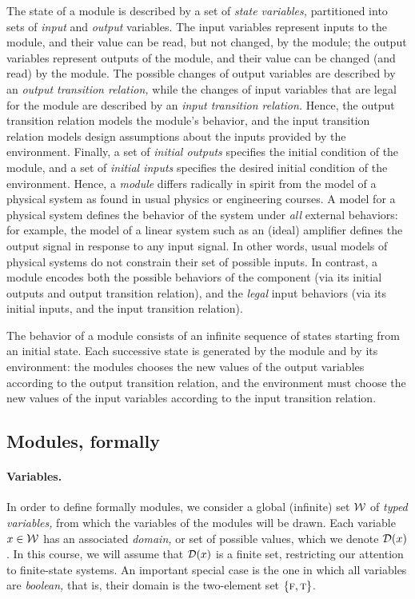 \documentclass[11pt]{report}
\begin{document}
The state of a module is described by a set of {\em state
variables,} partitioned into sets of {\em input\/} and {\em output\/}
variables.
The input variables represent inputs to the module, and their value
can be read, but not changed, by the module; the output variables
represent outputs of the module, and their value can be changed (and
read) by the module.
The possible changes of output variables are described by an
{\em output transition relation,} while the changes of input variables
that are legal for the module are described by an
{\em input transition relation.}
Hence, the output transition relation models the module's behavior,
and the input transition relation models design assumptions about the
inputs provided by the environment.
Finally, a set of {\em initial outputs\/} specifies the initial
condition of the module, and a set of {\em initial inputs\/} specifies
the desired initial condition of the environment.
Hence, a {\em module\/} differs radically in spirit from the model of
a physical system as found in usual physics or engineering courses.
A model for a physical system defines the behavior of the system under
{\em all\/} external behaviors: for example, the model of a linear
system such as an (ideal) amplifier defines the output signal in
response to any input signal.
In other words, usual models of physical systems do not constrain
their set of possible inputs.
In contrast, a module encodes both the possible behaviors of the
component (via its initial outputs and output transition relation),
and the {\em legal\/} input behaviors (via its initial inputs, and the
input transition relation).

The behavior of a module consists of an infinite sequence
of states starting from an initial state.
Each successive state is generated by the module and by its
environment:
the modules chooses the new values of the output
variables according to the output transition relation,
and the environment must choose the new values of the input variables
according to the input transition relation.


\subsection{Modules, formally}

\paragraph{Variables.}
In order to define formally modules, we consider a global
(infinite) set ${\cal W}$ of {\em typed variables,} from which the
variables of the modules will be drawn.
Each variable $x \in {\cal W}$ has an associated {\em domain,} or set
of possible values, which we denote ${\cal D}(x)$.
In this course, we will assume that ${\cal D}(x)$ is a finite set,
restricting our attention to finite-state systems.
An important special case is the one in which all variables are
{\em boolean,} that is, their domain is the two-element set
$\{ \mbox{\sc f},\mbox{\sc t} \}$.
\end{document}
